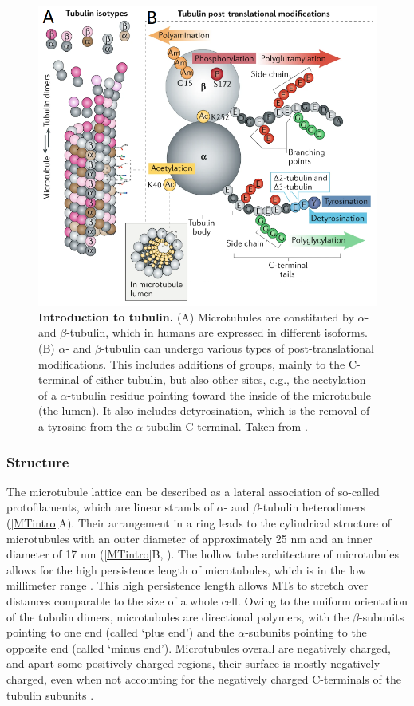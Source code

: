 \begin{figure}[h!tb]
	\centering
	\includegraphics[width=0.6\linewidth]{Figures/tubcode.png}
	\caption[Introduction to tubulin.]{\textbf{Introduction to tubulin.}
	(A) Microtubules are constituted by $\alpha$- and $\beta$-tubulin, which in humans are expressed in different isoforms. (B) $\alpha$- and $\beta$-tubulin can undergo various types of post-translational modifications. This includes additions of groups, mainly to the C-terminal of either tubulin, but also other sites, e.g., the acetylation of a $\alpha$-tubulin residue pointing toward the inside of the microtubule (the lumen). It also includes detyrosination, which is the removal of a tyrosine from the $\alpha$-tubulin C-terminal. Taken from \cite{Janke2020}.
		}\label{tubcode}
\end{figure}

\subsubsection{Structure}
The microtubule lattice can be described as a lateral association of so-called protofilaments, which are linear strands of $\alpha$- and $\beta$-tubulin heterodimers (\autoref{MTintro}A). Their arrangement in a ring leads to the cylindrical structure of microtubules with an outer diameter of approximately 25 nm and an inner diameter of 17 nm (\autoref{MTintro}B, ). The hollow tube architecture of microtubules allows for the high persistence length of microtubules, which is in the low millimeter range \parencite{Hawkins2010}. This high persistence length allows MTs to stretch over distances comparable to the size of a whole cell. Owing to the uniform orientation of the tubulin dimers, microtubules are directional polymers, with the $\beta$-subunits pointing to one end (called ‘plus end’) and the $\alpha$-subunits pointing to the opposite end (called ‘minus end’). Microtubules overall are negatively charged, and apart some positively charged regions, their surface is mostly negatively charged, even when not accounting for the negatively charged C-terminals of the tubulin subunits .\par

